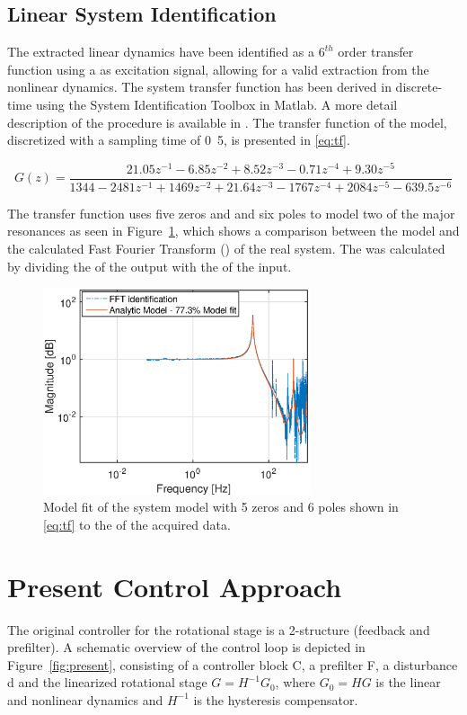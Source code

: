 \subsection{Linear System Identification}
\label{sec:linsys}
The extracted linear dynamics have been identified as a $6^{th}$ order transfer function using a \abbrPRBS as excitation signal, allowing for a valid extraction from the nonlinear dynamics. The system transfer function has been derived in discrete-time using the System Identification Toolbox in Matlab. A more detail description of the procedure is available in \citep{ButcherController:2015}. The transfer function of the model, discretized with a sampling time of \unit{0.5}{\milli\second}, is presented in \eqref{eq:tf}.

\begin{equation}
  \label{eq:tf}
  G(z) = \frac{21.05z^{-1} - 6.85z^{-2} + 8.52z^{-3} - 0.71z^{-4} + 9.30z^{-5}}{1344 - 2481z^{-1} + 1469z^{-2} + 21.64z^{-3} - 1767z^{-4} + 2084z^{-5} - 639.5z^{-6}}
\end{equation}

The transfer function uses five zeros and and six poles to model two of the major resonances as seen in Figure~\ref{fig:model}, which shows a comparison between the model and the calculated Fast Fourier Transform (\abbrFFT) of the real system. The \abbrFFT was calculated by dividing the \abbrFFT of the output with the \abbrFFT of the input.

\begin{figure}[h!]
  \centering
  \includegraphics[width=0.7\textwidth]{fig/matlab/model.eps}
  \caption{\label{fig:model} Model fit of the system model with 5 zeros and 6 poles shown in \eqref{eq:tf} to the \abbrFFT of the acquired data.}
\end{figure}

\FloatBarrier
\section{Present Control Approach}\label{sec:presentControlApproach}
The original controller for the rotational stage is a 2-\abbrDOF structure (feedback and prefilter). A schematic overview of the control loop is depicted in Figure~\ref{fig:present}, consisting of a controller block C, a prefilter F, a disturbance d and the linearized rotational stage $G = H^{-1}G_0$, where $G_0 = HG$ is the linear and nonlinear dynamics and $H^{-1}$ is the hysteresis compensator.

